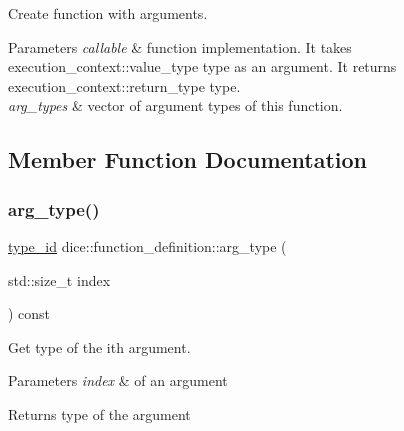 Create function with arguments. 


\begin{DoxyParams}{Parameters}
{\em callable} & function implementation. It takes execution\+\_\+context\+::value\+\_\+type type as an argument. It returns execution\+\_\+context\+::return\+\_\+type type. \\
\hline
{\em arg\+\_\+types} & vector of argument types of this function. \\
\hline
\end{DoxyParams}


\subsection{Member Function Documentation}
\mbox{\label{classdice_1_1function__definition_a1aba35d197d5db50f229bc81f4f489d3}} 
\subsubsection{\texorpdfstring{arg\+\_\+type()}{arg\_type()}}
{\footnotesize\ttfamily \mbox{\hyperlink{value_8hpp_ab9af7d8ecc381e026ca4d07a745f23eb}{type\+\_\+id}} dice\+::function\+\_\+definition\+::arg\+\_\+type (\begin{DoxyParamCaption}\item[{std\+::size\+\_\+t}]{index }\end{DoxyParamCaption}) const\hspace{0.3cm}{\ttfamily [inline]}}



Get type of the ith argument. 


\begin{DoxyParams}{Parameters}
{\em index} & of an argument \\
\hline
\end{DoxyParams}
\begin{DoxyReturn}{Returns}
type of the argument 
\end{DoxyReturn}
\mbox{\label{classdice_1_1function__definition_a5de84af8250e195aaf76bf84856d9aeb}} 
